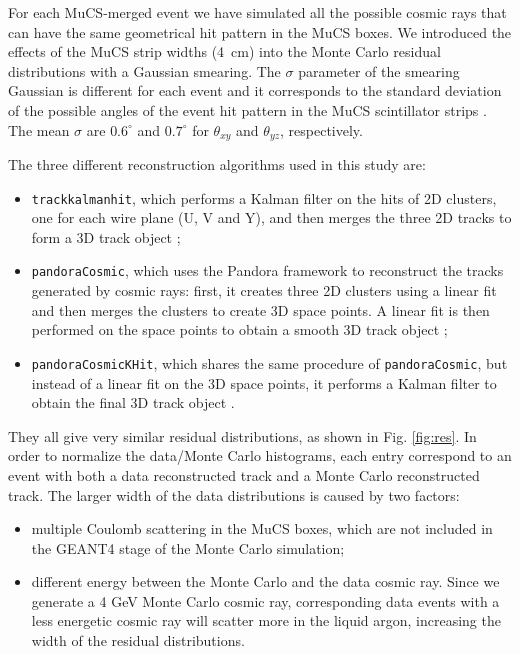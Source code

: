 \documentclass[a4paper]{scrartcl}
\begin{document}
For each MuCS-merged event we have simulated all the possible cosmic rays that can have the same geometrical hit pattern in the MuCS boxes. %
We introduced the effects of the MuCS strip widths (4~cm) into the Monte Carlo residual distributions with a Gaussian smearing. The $\sigma$ parameter of the smearing Gaussian is different for each event and it corresponds to the standard deviation of the possible angles of the event hit pattern in the MuCS scintillator strips \cite{mucsextra}. The mean $\sigma$ are $0.6^{\circ}$ and $0.7^{\circ}$ for $\theta_{xy}$ and $\theta_{yz}$, respectively.%

The three different reconstruction algorithms used in this study are:
\begin{itemize}
\item \texttt{track\-kal\-man\-hit}, which performs a Kalman filter \cite{trackkalmanhit} on the hits of 2D clusters, one for each wire plane (U, V and Y), and then merges the three 2D tracks to form a 3D track object \cite{kalmanhit};
\item \texttt{pan\-do\-ra\-Co\-smic}, which uses the Pandora framework \cite{pandora} to reconstruct the tracks generated by cosmic rays: first, it creates three 2D clusters using a linear fit and then merges the clusters to create 3D space points. A linear fit is then performed on the space points to obtain a smooth 3D track object \cite{pandoracosmic};
\item \texttt{pan\-do\-ra\-Co\-smicKHit}, which shares the same procedure of \texttt{pan\-do\-ra\-Co\-smic}, but instead of a linear fit on the 3D space points, it performs a Kalman filter to obtain the final 3D track object \cite{pandoracosmic}.
\end{itemize}

They all give very similar residual distributions, as shown in Fig. \ref{fig:res}. In order to normalize the data/Monte Carlo histograms, each entry correspond to an event with both a data reconstructed track and a Monte Carlo reconstructed track.
The larger width of the data distributions is caused by two factors:
\begin{itemize}
\item multiple Coulomb scattering in the MuCS boxes, which are not included in the GEANT4 stage of the Monte Carlo simulation;
\item different energy between the Monte Carlo and the data cosmic ray. Since we generate a 4 GeV Monte Carlo cosmic ray, corresponding data events with a less energetic cosmic ray will scatter more in the liquid argon, increasing the width of the residual distributions.
\end{itemize}
\end{document}
